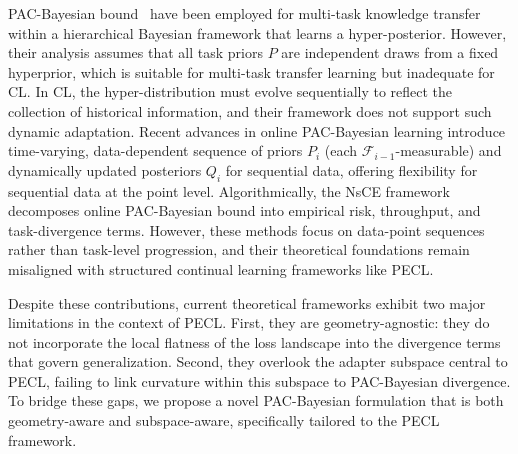 \documentclass{article} %
\begin{document}




PAC-Bayesian bound~\cite{pentinaPACBayesianBoundLifelong2014,JMLR:v24:22-1254}  have been employed for multi-task knowledge transfer within a hierarchical Bayesian framework that learns a hyper-posterior. However, their analysis assumes that all task priors $P$ are independent draws from a {fixed} hyperprior, which is suitable for multi-task transfer learning but inadequate for CL. In CL, the hyper-distribution must evolve sequentially to  reflect the collection of historical information, and their framework does not support such dynamic adaptation. 
Recent advances in online PAC-Bayesian learning \cite{NEURIPS2022_onlineBayes} introduce time-varying, data-dependent sequence of priors \( P_i \) (each \( \mathcal{F}_{i-1}\)-measurable) and dynamically updated posteriors \(Q_i\) for sequential data, offering flexibility for sequential data at the point level.  Algorithmically, the NsCE framework decomposes online PAC-Bayesian bound into empirical risk, throughput, and task-divergence terms\cite{NEURIPS2024_xinrui}. However, these methods focus on data-point sequences rather than task-level progression, and their theoretical foundations remain misaligned with structured continual learning frameworks like PECL.


Despite these contributions, current theoretical frameworks exhibit two major limitations in the context of PECL. First, they are geometry-agnostic: they do not incorporate the local flatness of the loss landscape into the divergence terms that govern generalization. Second, they overlook the adapter subspace central to PECL, failing to link curvature within this subspace to PAC-Bayesian divergence. To bridge these gaps, we propose a novel PAC-Bayesian formulation that is both geometry-aware and subspace-aware, specifically tailored to the PECL framework.
\end{document}
